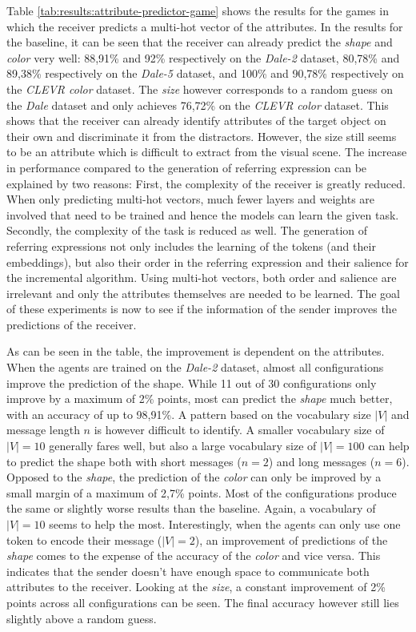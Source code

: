 Table \ref{tab:results:attribute-predictor-game} shows the results for the games in which the receiver predicts a multi-hot vector of the attributes.
In the results for the baseline, it can be seen that the receiver can already predict the \emph{shape} and \emph{color}  very well: 88,91\% and 92\% respectively on the \emph{Dale-2} dataset, 80,78\% and 89,38\% respectively on the \emph{Dale-5} dataset, and 100\% and 90,78\% respectively on the \emph{CLEVR color} dataset.
The \emph{size} however corresponds to a random guess on the \emph{Dale} dataset and only achieves 76,72\% on the \emph{CLEVR color} dataset.
This shows that the receiver can already identify attributes of the target object on their own and discriminate it from the distractors.
However, the size still seems to be an attribute which is difficult to extract from the visual scene.
The increase in performance compared to the generation of referring expression can be explained by two reasons:
First, the complexity of the receiver is greatly reduced.
When only predicting multi-hot vectors, much fewer layers and weights are involved that need to be trained and hence the models can learn the given task.
Secondly, the complexity of the task is reduced as well.
The generation of referring expressions not only includes the learning of the tokens (and their embeddings), but also their order in the referring expression and their salience for the incremental algorithm.
Using multi-hot vectors, both order and salience are irrelevant and only the attributes themselves are needed to be learned.
The goal of these experiments is now to see if the information of the sender improves the predictions of the receiver.

As can be seen in the table, the improvement is dependent on the attributes.
When the agents are trained on the \emph{Dale-2} dataset, almost all configurations improve the prediction of the shape.
While 11 out of 30 configurations only improve by a maximum of 2\% points, most can predict the \emph{shape} much better, with an accuracy of up to 98,91\%.
A pattern based on the vocabulary size $|V|$ and message length $n$ is however difficult to identify.
A smaller vocabulary size of $|V|=10$ generally fares well, but also a large vocabulary size of $|V|=100$ can help to predict the shape both with short messages ($n=2$) and long messages ($n=6$).
Opposed to the \emph{shape}, the prediction of the \emph{color} can only be improved by a small margin of a maximum of 2,7\% points.
Most of the configurations produce the same or slightly worse results than the baseline.
Again, a vocabulary of $|V|=10$ seems to help the most.
Interestingly, when the agents can only use one token to encode their message ($|V|=2$), an improvement of predictions of the \emph{shape} comes to the expense of the accuracy of the \emph{color} and vice versa.
This indicates that the sender doesn't have enough space to communicate both attributes to the receiver.
Looking at the \emph{size}, a constant improvement of 2\% points across all configurations can be seen.
The final accuracy however still lies slightly above a random guess.

